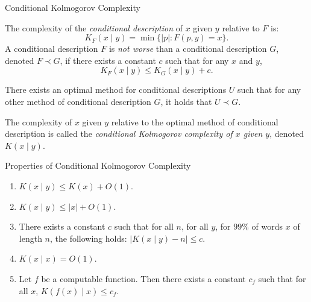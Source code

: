 \documentclass[
aspectratio=169]{beamer}
\begin{document}
\begin{frame}[fragile]{Conditional Kolmogorov Complexity}
\begin{definition} The complexity of the \emph{conditional description} of $x$ given $y$ relative to $F$ is:
    \[K_F(x \mid y) = \min\{|p| : F(p,y) = x\}.\]
A conditional description $F$ is \emph{not worse} than a conditional description $G$, denoted $F \prec G$, if there exists a constant $c$ such that for any $x$ and $y$,
    \[
    K_F(x \mid y) \le K_G(x \mid y) + c.
    \]
\end{definition}\vspace{-5mm}
\pause
\begin{theorem}
    There exists an optimal method for conditional descriptions $U$ such that for any other method of conditional description $G$, it holds that $U \prec G$.
\end{theorem}
\pause
\begin{definition}
    The complexity of $x$ given $y$ relative to the optimal method of conditional description is called the \emph{conditional Kolmogorov complexity of $x$ given $y$}, denoted $K(x \mid y)$.
\end{definition}

\end{frame}

\begin{frame}{Properties of Conditional Kolmogorov Complexity}
    \begin{enumerate}
    \item $K(x \mid y) \le K(x) + O(1)$.
    \item $K(x \mid y) \le |x| + O(1)$.
    \item There exists a constant $c$ such that for all $n$, for all $y$, for $99\%$ of words $x$ of length $n$, the following holds: \(|K(x \mid y) - n| \le c\).
    \item $K(x \mid x) = O(1)$.
    \item Let $f$ be a computable function. Then there exists a constant $c_f$ such that for all $x$, $K(f(x) \mid x) \le c_f$.
\end{enumerate}
\end{frame}
\end{document}
